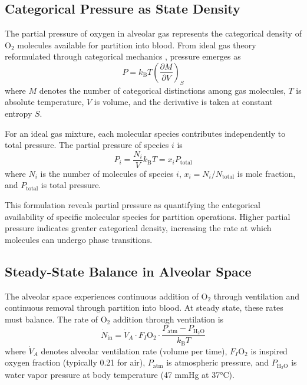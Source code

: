 \documentclass[10pt,twocolumn,a4paper]{article}
\theoremstyle{remark}
\newcommand{\kB}{k_{\mathrm{B}}}
\begin{document}
\subsection{Categorical Pressure as State Density}

The partial pressure of oxygen in alveolar gas represents the categorical density of O$_{2}$ molecules available for partition into blood. From ideal gas theory reformulated through categorical mechanics \cite{sachikonye2024gas}, pressure emerges as
\begin{equation}
P = \kB T \left(\frac{\partial M}{\partial V}\right)_{S}
\end{equation}
where $M$ denotes the number of categorical distinctions among gas molecules, $T$ is absolute temperature, $V$ is volume, and the derivative is taken at constant entropy $S$.

For an ideal gas mixture, each molecular species contributes independently to total pressure. The partial pressure of species $i$ is
\begin{equation}
P_{i} = \frac{N_{i}}{V} \kB T = x_{i} P_{\mathrm{total}}
\end{equation}
where $N_{i}$ is the number of molecules of species $i$, $x_{i} = N_{i}/N_{\mathrm{total}}$ is mole fraction, and $P_{\mathrm{total}}$ is total pressure.

This formulation reveals partial pressure as quantifying the categorical availability of specific molecular species for partition operations. Higher partial pressure indicates greater categorical density, increasing the rate at which molecules can undergo phase transitions.

\subsection{Steady-State Balance in Alveolar Space}

The alveolar space experiences continuous addition of O$_{2}$ through ventilation and continuous removal through partition into blood. At steady state, these rates must balance. The rate of O$_{2}$ addition through ventilation is
\begin{equation}
\dot{N}_{\mathrm{in}} = \dot{V}_{A} \cdot F_{I}\mathrm{O}_{2} \cdot \frac{P_{\mathrm{atm}} - P_{\mathrm{H}_{2}\mathrm{O}}}{\kB T}
\end{equation}
where $\dot{V}_{A}$ denotes alveolar ventilation rate (volume per time), $F_{I}\mathrm{O}_{2}$ is inspired oxygen fraction (typically 0.21 for air), $P_{\mathrm{atm}}$ is atmospheric pressure, and $P_{\mathrm{H}_{2}\mathrm{O}}$ is water vapor pressure at body temperature (47 mmHg at 37°C).
\end{document}
